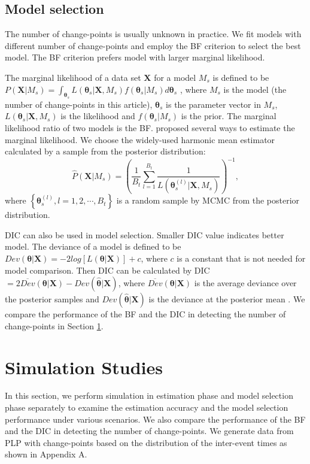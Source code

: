 \documentclass[12pt]{article}
\numberwithin{equation}{section}
\begin{document}
\subsection{Model selection}
The number of change-points is usually unknown in practice. We fit models with different number of change-points and employ the BF criterion to select the best model. The BF criterion prefers model with larger marginal likelihood.  

The marginal likelihood of a data set $\pmb X$ for a model $M_s$ is defined to be   
$P(\pmb X|M_s) = \int_{\pmb{\theta}_s}L(\pmb\theta_s |\pmb X, M_s)f(\pmb\theta_s|M_s)d\pmb{\theta}_s$ \citep{Raftery1996}, where $M_s$ is the model (the number of change-points in this article), $\pmb{\theta}_s$ is the parameter vector in $M_s$, $L(\pmb\theta_s |\pmb X, M_s)$ is the likelihood and $f(\pmb\theta_s|M_s)$ is the prior. The marginal likelihood ratio of two models is the BF.  \citet{Raftery1996} proposed several ways to estimate the marginal likelihood. We choose the widely-used harmonic mean estimator calculated by a sample from the posterior distribution:
\begin{equation}\label{eqn:LXM}
\hat P(\pmb X|M_s) = (\frac{1}{B_t}\sum\limits_{l=1}^{B_t}\frac{1}{L(\pmb\theta_s^{(l)}|\pmb X, M_s)})^{-1},
\end{equation}
where $\left\lbrace \pmb\theta_s^{(l)}, l = 1, 2, \cdots, B_t\right\rbrace $ is a random sample by MCMC from the posterior distribution. 

DIC \citep{Spieg2002} can also be used in model selection. Smaller DIC value indicates better model. The deviance of a model is defined to be $Dev(\pmb\theta|\pmb X) = -2 log[L(\pmb\theta|\pmb X)] + c$, where $c$ is a constant that is not needed for model comparison. Then DIC can be calculated by DIC $ = 2\overline {Dev}(\pmb\theta|\pmb X)-Dev(\hat{\pmb\theta}|\pmb X)$, where $\overline{Dev}(\pmb\theta|\pmb X)$ is the average deviance over the posterior samples and  $Dev(\hat{\pmb\theta}|\pmb X)$ is the deviance at the posterior mean \citep[p. 188]{Gelman2004}. We compare the performance of the  BF and the DIC in detecting the number of change-points in Section \ref{sec:simulation}.
\section{Simulation Studies}\label{sec:simulation}
In this section, we perform simulation in estimation phase and model selection phase separately to examine the estimation accuracy and the model selection performance  under various scenarios. We also compare the performance of the BF and the DIC in detecting the number of change-points. We generate data from PLP with change-points based on the distribution of the inter-event times \citep{Klein1984} as shown in Appendix A.
\end{document}
